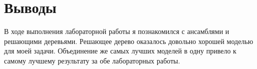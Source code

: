 \section{Выводы}

В ходе выполнения лабораторной работы я познакомился с ансамблями и решающими деревьями. Решающее дерево оказалось довольно хорошей моделью для моей задачи. Объединение же самых лучших моделей в одну привело к самому лучшему результату за обе лабораторных работы.
\pagebreak
